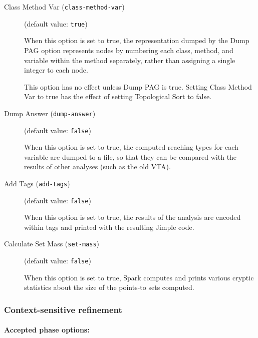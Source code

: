 \documentclass{article}
\begin{document}
\begin{description}
\item[Class Method Var ({\tt class-method-var})]
(default value: {\tt true})




When this option is set to true, the representation dumped by the
Dump PAG option
represents nodes by numbering each class, method, and variable within
the method separately, rather than assigning a single integer to each
node.

This option has no effect unless Dump PAG is true.  Setting Class
Method Var to true has the effect of setting Topological Sort to
false.
        


\item[Dump Answer ({\tt dump-answer})]
(default value: {\tt false})




When this option is set to true, the computed reaching types for each variable are
dumped to a file, so that they can be compared with the results of
other analyses (such as the old VTA).
        


\item[Add Tags ({\tt add-tags})]
(default value: {\tt false})




        When this option is set to true, the results of the analysis are encoded within
tags and printed with the resulting Jimple code.

        


\item[Calculate Set Mass ({\tt set-mass})]
(default value: {\tt false})




When this option is set to true, Spark computes and prints various
cryptic statistics about the size of the points-to sets computed.
        


\end{description}

\subsubsection{Context-sensitive refinement}


\paragraph{Accepted phase options:} 
\end{document}
